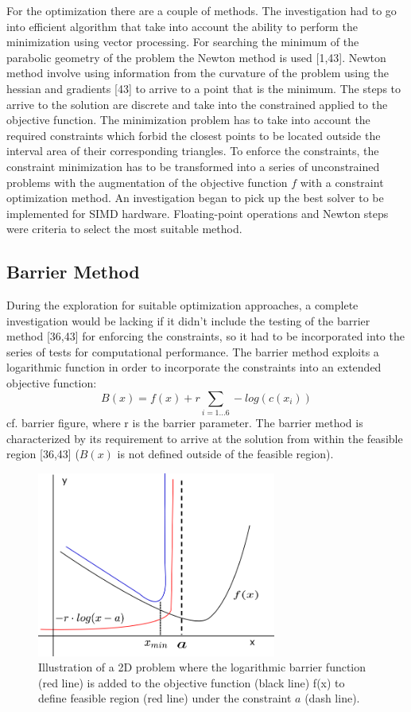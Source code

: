 \documentclass[times,12pt]{ACME2015article}
\begin{document}
For the optimization there are a couple of methods. The investigation had to go into efficient algorithm that take into account the ability to perform the minimization using vector processing. For searching the minimum of the parabolic geometry of the problem the Newton method is
 used [1,43]. Newton method involve using information from the curvature of the problem using the hessian and gradients [43] to arrive to a point that is the minimum. The steps to arrive to the solution are discrete and take into the constrained applied to the objective function. The minimization problem has to take into account the required constraints which forbid the closest points to be located outside the interval area of their corresponding triangles. To enforce the constraints, the constraint minimization has to be transformed into a series of unconstrained problems with the augmentation of the objective function $f$ with a constraint optimization method. An investigation began to pick up the best solver to be implemented for SIMD hardware. Floating-point operations and Newton steps were criteria to select the most suitable method. 

\subsection{Barrier Method}
During the exploration for suitable optimization approaches, a complete investigation would be lacking if it didn't include the testing of the barrier method [36,43] for enforcing the constraints, so it had to be incorporated into the series of tests for computational performance. The barrier method exploits a logarithmic function in order to incorporate the constraints into an extended objective function: 
\begin{equation}
B(x)=f(x)+r\sum_{i=1...6}-log(c(x_{i}))
\end{equation} cf. barrier figure, where r is the barrier parameter. The barrier method is characterized by its requirement to arrive at the solution from within the feasible region [36,43] ($B(x)$ is not defined outside of the feasible region).

\begin{figure}[!h]
\centering
\includegraphics[width=0.7\textwidth]{barrier} \protect\caption{\label{fig12}Illustration of a 2D problem where the logarithmic barrier function (red line) is added to the objective function (black line) f(x) to define feasible region (red line) under the constraint $a$ (dash line). }
\end{figure} 
\end{document}
